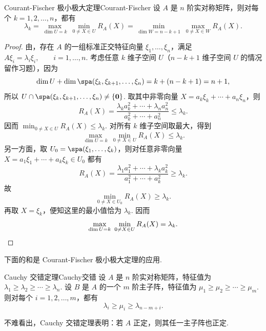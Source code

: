 \begin{theorem}{Courant-Fischer 极小极大定理}{Courant-Fischer}
    设 $A$ 是 $n$ 阶实对称矩阵，则对每个 $k = 1, 2, \ldots, n$，都有
    \[
        \lambda_k = \max_{\dim U=k}\ \min_{0\neq X\in U}R_A(X) = \min_{\dim W=n-k+1}\ \max_{0\neq X\in W}R_A(X).
    \]
\end{theorem}

\begin{proof}
    由，存在 $A$ 的一组标准正交特征向量 $\xi_1,\ldots,\xi_n$，满足 $A\xi_i=\lambda_i\xi_i,\qquad i=1,\ldots,n$. 考虑任意 $k$ 维子空间 $U$（$n - k + 1$ 维子空间 $U$ 的情况留作习题），因为
    \[
        \dim U+\dim\spa(\xi_k,\xi_{k+1},\ldots,\xi_n)=k+(n-k+1)=n+1,
    \]
    所以 $U\cap \spa(\xi_k,\xi_{k+1},\ldots,\xi_n)\neq \{\vec{0}\}$. 取其中非零向量 $X=a_k\xi_k+\cdots+a_n\xi_n$，则
    \[
        R_A(X)=\frac{\lambda_ka_k^2+\cdots+\lambda_na_n^2}{a_k^2+\cdots+a_n^2}\leqslant \lambda_k.
    \]
    因而 $\min_{0\neq X\in U}R_A(X)\leqslant \lambda_k$. 对所有 $k$ 维子空间取最大，得到
    \[
        \max_{\dim U=k}\ \min_{0\neq X\in U}R_A(X)\leqslant \lambda_k.
    \]
    另一方面，取 $U_0=\spa(\xi_1,\ldots,\xi_k)$，则对任意非零向量 $X=a_1\xi_1+\cdots+a_k\xi_k\in U_0$ 都有
    \[
        R_A(X)=\frac{\lambda_1a_1^2+\cdots+\lambda_ka_k^2}{a_1^2+\cdots+a_k^2}\geqslant \lambda_k.
    \]
    故
    \[
        \min_{0\neq X\in U_0}R_A(X)\geqslant \lambda_k.
    \]
    再取 $X=\xi_k$，便知这里的最小值恰为 $\lambda_k$. 因而
    \[
        \max_{\dim U=k}\ \min_{0\neq X\in U}R_A(X)=\lambda_k. \qedhere
    \]
\end{proof}

下面的和是 Courant-Fischer 极小极大定理的应用.

\begin{theorem}{Cauchy 交错定理}{Cauchy交错}
    设 $A$ 是 $n$ 阶实对称矩阵，特征值为 $\lambda_1\geqslant \lambda_2\geqslant \cdots \geqslant \lambda_n$. 设 $B$ 是 $A$ 的一个 $m$ 阶主子阵，特征值为 $\mu_1\geqslant \mu_2\geqslant \cdots \geqslant \mu_m$. 则对每个 $i=1,2,\ldots,m$，都有
    \[
        \lambda_i\geqslant \mu_i\geqslant \lambda_{n-m+i}.
    \]
\end{theorem}

不难看出，Cauchy 交错定理表明：若 $A$ 正定，则其任一主子阵也正定.

